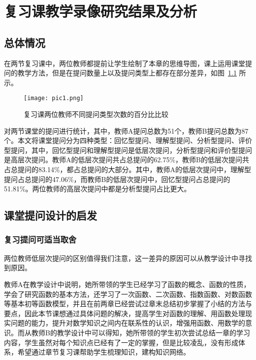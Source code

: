 \chapter{复习课教学录像研究结果及分析}


\section{总体情况}

在两节复习课中，两位教师都提前让学生绘制了本章的思维导图，课上运用课堂提问的教学方法，但是在提问数量上以及提问类型上都存在部分差异，如图~\ref{fig:1} 所示。

\begin{figure}[htbp]
  \centering
  \texttt{[image: pic1.png]}
  \caption{复习课两位教师不同提问类型次数的百分比比较}
  \label{fig:1}
\end{figure}

对两节课堂的提问进行统计，其中，教师A提问总数为51个，教师B提问总数为87个。本文将课堂提问分为四种类型：回忆型提问、理解型提问、分析型提问、评价型提问，其中，回忆型提问和理解型提问是低层次提问，分析型提问和评价型提问是高层次提问。教师A的低层次提问共占总提问的62.75\%，教师B的低层次提问共占总提问的83.14\%，都占总提问的大部分。其中，教师A的低层次提问中，理解型提问占总提问的47.06\%，而教师B的低层次提问中，回忆型提问占总提问的51.81\%。两位教师的高层次提问中都是分析型提问占比更大。



\section{课堂提问设计的启发}

\subsection{复习提问可适当取舍}

两位教师低层次提问的区别值得我们注意，这一差异的原因可以从教学设计中寻找到原因。

教师A在教学设计中说明，她所带领的学生已经学习了函数的概念、函数的性质，学会了研究函数的基本方法，还学习了一次函数、二次函数、指数函数、对数函数等基本初等函数模型，并且在前两章已经尝试过章末总结初步掌握了小结的方法与要点，因此本节课想通过具体问题的解决，提高学生对函数的理解、用函数处理现实问题的能力，提升对数学知识之间内在联系性的认识，增强用函数、用数学的意识。而从教师B的教学设计中可以得知，她所带领的学生初次尝试总结一章的学习内容，学生虽然对每个知识点已经有了一定的掌握，但是比较凌乱，没有形成体系，希望通过章节复习课帮助学生梳理知识，建构知识网络。

